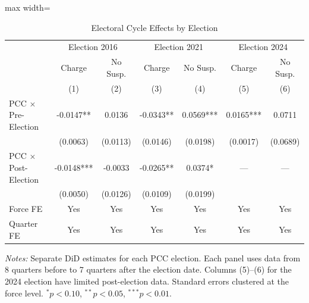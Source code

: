 \begin{table}[htbp]
\centering
\caption{Electoral Cycle Effects by Election}
\label{tab:byelection}
\begin{adjustbox}{max width=\textwidth}
\begin{tabular}{lcccccc}
\hline\hline
 & \multicolumn{2}{c}{Election 2016} & \multicolumn{2}{c}{Election 2021} & \multicolumn{2}{c}{Election 2024} \\
 & Charge & No Susp. & Charge & No Susp. & Charge & No Susp. \\
 & (1) & (2) & (3) & (4) & (5) & (6) \\
\hline
PCC $\times$ Pre-Election & -0.0147** & 0.0136 & -0.0343** & 0.0569*** & 0.0165*** & 0.0711 \\
  & (0.0063) & (0.0113) & (0.0146) & (0.0198) & (0.0017) & (0.0689) \\
PCC $\times$ Post-Election & -0.0148*** & -0.0033 & -0.0265** & 0.0374* & --- & --- \\
  & (0.0050) & (0.0126) & (0.0109) & (0.0199) &  &  \\
\hline
Force FE & Yes & Yes & Yes & Yes & Yes & Yes \\
Quarter FE & Yes & Yes & Yes & Yes & Yes & Yes \\
\hline\hline
\end{tabular}
\end{adjustbox}
\begin{tablenotes}[flushleft]
\item \textit{Notes:} Separate DiD estimates for each PCC election. Each panel uses data from 8 quarters before to 7 quarters after the election date. Columns (5)--(6) for the 2024 election have limited post-election data. Standard errors clustered at the force level. $^{*}p<0.10$, $^{**}p<0.05$, $^{***}p<0.01$.
\end{tablenotes}
\end{table}

